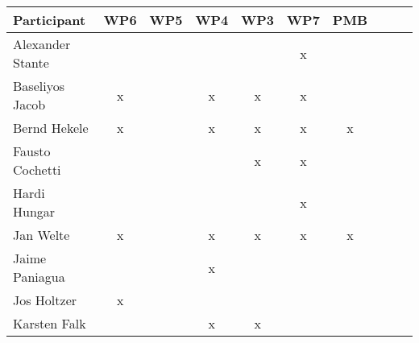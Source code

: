 \documentclass[a4paper, 11pt]{article}
\begin{document}
\begin{tabular}{|l|c|c|c||c|c|c||c|c|c|}
\hline
\textbf{Participant} & \textbf{WP6} &  \textbf{WP5} & \textbf{WP4}&  \textbf{WP3} & \textbf{WP7}&  \textbf{PMB} \\\hline
Alexander Stante     &   &   &   &   & x &   \\\hline 
Baseliyos Jacob      & x &   & x & x & x &   \\\hline 
Bernd Hekele         & x &   & x & x & x & x \\\hline
Fausto Cochetti      &   &   &   & x & x &   \\\hline
Hardi Hungar         &   &   &   &   & x &   \\\hline
Jan Welte            & x &   & x & x & x & x \\\hline
Jaime Paniagua       &   &   & x &   &   &   \\\hline
Jos Holtzer          & x &   &   &   &   &   \\\hline
Karsten Falk         &   &   & x & x &   &   \\\hline

\end{tabular}
\end{document}
